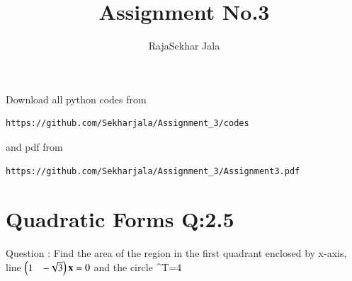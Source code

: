 \documentclass[journal,12pt,twocolumn]{IEEEtran}
\begin{document}
\makeatother
\let\StandardTheFigure\thefigure
\let\vec\mathbf
\renewcommand{\thefigure}{\theproblem}
\def\putbox#1#2#3{\makebox[0in][l]{\makebox[#1][l]{}\raisebox{\baselineskip}[0in][0in]{\raisebox{#2}[0in][0in]{#3}}}}
     \def\rightbox#1{\makebox[0in][r]{#1}}
     \def\centbox#1{\makebox[0in]{#1}}
     \def\topbox#1{\raisebox{-\baselineskip}[0in][0in]{#1}}
     \def\midbox#1{\raisebox{-0.5\baselineskip}[0in][0in]{#1}}
\vspace{3cm}
\title{Assignment No.3}
\author{RajaSekhar Jala}
\maketitle
\newpage
\bigskip
\renewcommand{\thefigure}{\theenumi}
\renewcommand{\thetable}{\theenumi}
Download all python codes from 
\begin{lstlisting}
https://github.com/Sekharjala/Assignment_3/codes
\end{lstlisting}
%
and pdf from 
%
\begin{lstlisting}
https://github.com/Sekharjala/Assignment_3/Assignment3.pdf
\end{lstlisting}
%
\section{Quadratic Forms Q:2.5}
Question :
Find the area of the region in the first quadrant enclosed by x-axis, line $\myvec{1 & -\sqrt{3}}\vec{x} =0$ and the circle \vec{x}^T\vec{x}=4
\end{document}
